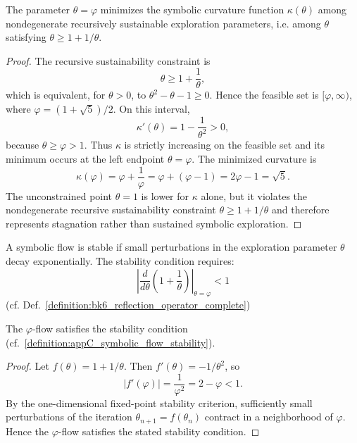 \begin{theorem}
\label{theorem:appC_phi_minimal_curvature_parameter}
The parameter $\theta = \varphi$ minimizes the symbolic curvature function
$\kappa(\theta)$ among nondegenerate recursively sustainable exploration
parameters, i.e. among $\theta$ satisfying $\theta\ge 1+1/\theta$.
\end{theorem}

\begin{proof}
\label{proof:appC_phi_minimal_curvature}
The recursive sustainability constraint is
\[
\theta\ge 1+\frac{1}{\theta},
\]
which is equivalent, for $\theta>0$, to
$\theta^2-\theta-1\ge0$. Hence the feasible set is
$[\varphi,\infty)$, where $\varphi=(1+\sqrt5)/2$. On this interval,
\[
\kappa'(\theta)=1-\frac{1}{\theta^2}>0,
\]
because $\theta\ge\varphi>1$. Thus $\kappa$ is strictly increasing on the feasible
set and its minimum occurs at the left endpoint $\theta=\varphi$. The minimized
curvature is
\[
\kappa(\varphi)=\varphi+\frac1\varphi=\varphi+(\varphi-1)=2\varphi-1=\sqrt5.
\]
The unconstrained point $\theta=1$ is lower for $\kappa$ alone, but it violates
the nondegenerate recursive sustainability constraint $\theta\ge1+1/\theta$ and
therefore represents stagnation rather than sustained symbolic exploration.
\end{proof}

\begin{definition}
\label{definition:appC_symbolic_flow_stability}
A symbolic flow is stable if small perturbations in the exploration parameter $\theta$ decay exponentially. The stability condition requires:
\[
\left| \frac{d}{d\theta} \left( 1 + \frac{1}{\theta} \right) \right|_{\theta=\varphi} < 1
\]
(cf. Def.~\ref{definition:bk6_reflection_operator_complete})
\end{definition}

\begin{lemma}
\label{lemma:appC_stability_phi_flow}
The $\varphi$-flow satisfies the stability condition (cf.~\ref{definition:appC_symbolic_flow_stability}).
\end{lemma}

\begin{proof}
\label{proof:appC_stability_phi_flow}
Let $f(\theta)=1+1/\theta$. Then $f'(\theta)=-1/\theta^2$, so
\[
|f'(\varphi)|=\frac{1}{\varphi^2}=2-\varphi<1.
\]
By the one-dimensional fixed-point stability criterion, sufficiently small
perturbations of the iteration $\theta_{n+1}=f(\theta_n)$ contract in a
neighborhood of $\varphi$. Hence the $\varphi$-flow satisfies the stated stability
condition.
\end{proof}

